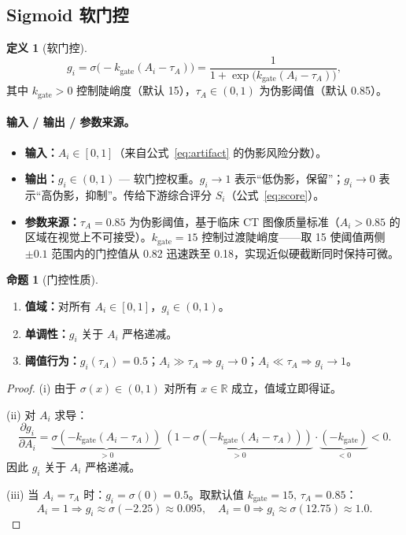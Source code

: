 \documentclass[11pt,a4paper]{article}
\newcommand{\RR}{\mathbb{R}}
\newcommand{\sigmoid}{\sigma}
\theoremstyle{definition}
\newtheorem{definition}{定义}[section]
\newtheorem{proposition}{命题}[section]
\begin{document}
\subsection{Sigmoid 软门控}

\begin{definition}[软门控]
\begin{equation}\label{eq:gate}
g_i = \sigmoid\!\big(-k_{\mathrm{gate}}(A_i - \tau_A)\big)
    = \frac{1}{1 + \exp\!\big(k_{\mathrm{gate}}(A_i - \tau_A)\big)},
\end{equation}
其中 $k_{\mathrm{gate}} > 0$ 控制陡峭度（默认 15），$\tau_A \in (0,1)$ 为伪影阈值（默认 0.85）。
\end{definition}

\paragraph{输入 / 输出 / 参数来源。}
\begin{itemize}[nosep]
    \item \textbf{输入：}$A_i \in [0,1]$（来自公式~\ref{eq:artifact} 的伪影风险分数）。
    \item \textbf{输出：}$g_i \in (0,1)$ — 软门控权重。$g_i \to 1$ 表示``低伪影，保留''；$g_i \to 0$ 表示``高伪影，抑制''。传给下游综合评分 $S_i$（公式~\ref{eq:score}）。
    \item \textbf{参数来源：}$\tau_A = 0.85$ 为伪影阈值，基于临床 CT 图像质量标准（$A_i > 0.85$ 的区域在视觉上不可接受）。$k_{\mathrm{gate}} = 15$ 控制过渡陡峭度——取 15 使阈值两侧 $\pm 0.1$ 范围内的门控值从 0.82 迅速跌至 0.18，实现近似硬截断同时保持可微。
\end{itemize}

\begin{proposition}[门控性质]\label{prop:gate}
\begin{enumerate}[label=(\roman*)]
    \item \textbf{值域：}对所有 $A_i \in [0,1]$，$g_i \in (0,1)$。
    \item \textbf{单调性：}$g_i$ 关于 $A_i$ 严格递减。
    \item \textbf{阈值行为：}$g_i(\tau_A) = 0.5$；$A_i \gg \tau_A \Rightarrow g_i \to 0$；$A_i \ll \tau_A \Rightarrow g_i \to 1$。
\end{enumerate}
\end{proposition}

\begin{proof}
(i) 由于 $\sigmoid(x) \in (0,1)$ 对所有 $x \in \RR$ 成立，值域立即得证。

(ii) 对 $A_i$ 求导：
\begin{equation}
\frac{\partial g_i}{\partial A_i}
= \underbrace{\sigmoid(-k_{\mathrm{gate}}(A_i-\tau_A))}_{>0}\;
  \underbrace{(1 - \sigmoid(-k_{\mathrm{gate}}(A_i-\tau_A)))}_{>0}
  \cdot \underbrace{(-k_{\mathrm{gate}})}_{<0} < 0.
\end{equation}
因此 $g_i$ 关于 $A_i$ 严格递减。

(iii) 当 $A_i=\tau_A$ 时：$g_i=\sigmoid(0)=0.5$。取默认值 $k_{\mathrm{gate}}=15,\,\tau_A=0.85$：
\[
A_i=1 \Rightarrow g_i \approx \sigmoid(-2.25) \approx 0.095, \quad
A_i=0 \Rightarrow g_i \approx \sigmoid(12.75) \approx 1.0.
\]
\end{proof}
\end{document}
